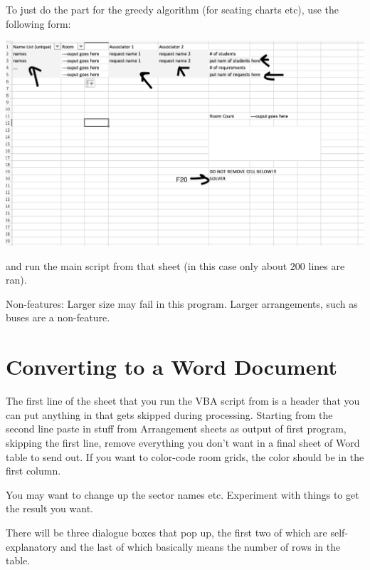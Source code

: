 \documentclass[openany,notitlepage]{book}
\begin{document}
	To just do the part for the greedy algorithm (for seating charts etc), use the following form:
	\begin{center}
		\includegraphics[width=0.8\linewidth]{"pic"}
	\end{center}
	and run the main script from that sheet (in this case only about $200$ lines are ran).
	
	Non-features: Larger size may fail in this program. Larger arrangements, such as buses  are a non-feature.
	
	\chapter{Converting to a Word Document}
	
	
	The first line of the sheet that you run the VBA script from is a header that you can put anything in that gets skipped during processing. Starting from the second line paste in stuff from Arrangement
	sheets as output of first program, skipping the first line, remove everything you don't want in a final sheet of Word table to send out. If you want to color-code room grids, the color should be in the first column.
	
	You may want to change up the sector names etc. Experiment with things to get the result you want.
	
	There will be three dialogue boxes that pop up, the first two of which are self-explanatory and the last of which basically means the number of rows in the table.
	\printindex
\end{document}
